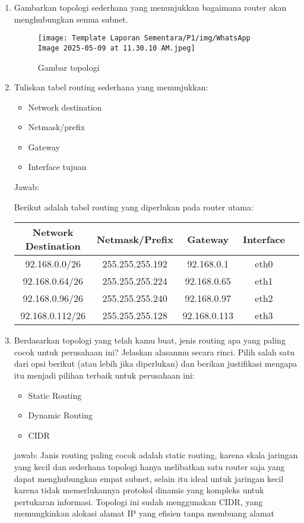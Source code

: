 \begin{enumerate}
\item Gambarkan topologi sederhana yang menunjukkan bagaimana router akan menghubungkan semua subnet.
\begin{figure}[h!]
  \centering
  \texttt{[image: Template Laporan Sementara/P1/img/WhatsApp Image 2025-05-09 at 11.30.10 AM.jpeg]}
  \caption{Gambar topologi}
\end{figure}
\item Tuliskan tabel routing sederhana yang menunjukkan:
\begin{itemize}
        \item Network destination
        \item Netmask/prefix
        \item Gateway
        \item Interface tujuan
    \end{itemize}

    Jawab:
    
    Berikut adalah tabel routing yang diperlukan pada router utama:
\begin{center}
\begin{tabular}{ |c|c|c|c|c| } 
\hline
Network Destination & Netmask/Prefix & Gateway & Interface\\
\hline
92.168.0.0/26 & 255.255.255.192 & 92.168.0.1 & eth0  \\
92.168.0.64/26 & 255.255.255.224 & 92.168.0.65 & eth1  \\
92.168.0.96/26 & 255.255.255.240 & 92.168.0.97 & eth2  \\
92.168.0.112/26 & 255.255.255.128 & 92.168.0.113 & eth3  \\
\hline
\end{tabular}
\end{center}

\item Berdasarkan topologi yang telah kamu buat, jenis routing apa yang paling cocok untuk perusahaan ini? Jelaskan alasanmu secara rinci. Pilih salah satu dari opsi berikut (atau lebih jika diperlukan) dan berikan justifikasi mengapa itu menjadi pilihan terbaik untuk perusahaan ini:
\begin{itemize}
        \item Static Routing
        \item Dynamic Routing
        \item CIDR
    \end{itemize}

    jawab:
    Janis routing paling cocok adalah static routing, karena skala jaringan yang kecil dan sederhana topologi hanya melibatkan satu router saja yang dapat menghubungkan empat subnet, selain itu ideal untuk jaringan kecil karena tidak memerlukannya protokol dinamis yang kompleks untuk pertukaran informasi. Topologi ini sudah menggunakan CIDR, yang memungkinkan alokasi alamat IP yang efisien tanpa membuang alamat
\end{enumerate}